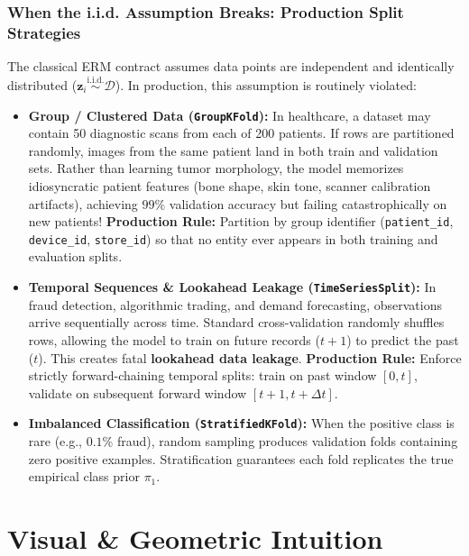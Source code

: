 \subsubsection{When the i.i.d. Assumption Breaks: Production Split Strategies}
The classical ERM contract assumes data points are independent and identically distributed ($\mathbf{z}_i \overset{\text{i.i.d.}}{\sim} \mathcal{D}$). In production, this assumption is routinely violated:
\begin{itemize}
    \item \textbf{Group / Clustered Data (\texttt{GroupKFold}):} In healthcare, a dataset may contain 50 diagnostic scans from each of 200 patients. If rows are partitioned randomly, images from the same patient land in both train and validation sets. Rather than learning tumor morphology, the model memorizes idiosyncratic patient features (bone shape, skin tone, scanner calibration artifacts), achieving $99\%$ validation accuracy but failing catastrophically on new patients! \textbf{Production Rule:} Partition by group identifier (\texttt{patient\_id}, \texttt{device\_id}, \texttt{store\_id}) so that no entity ever appears in both training and evaluation splits.
    \item \textbf{Temporal Sequences \& Lookahead Leakage (\texttt{TimeSeriesSplit}):} In fraud detection, algorithmic trading, and demand forecasting, observations arrive sequentially across time. Standard cross-validation randomly shuffles rows, allowing the model to train on future records ($t+1$) to predict the past ($t$). This creates fatal \textbf{lookahead data leakage}. \textbf{Production Rule:} Enforce strictly forward-chaining temporal splits: train on past window $[0, t]$, validate on subsequent forward window $[t+1, t+\Delta t]$.
    \item \textbf{Imbalanced Classification (\texttt{StratifiedKFold}):} When the positive class is rare (e.g., $0.1\%$ fraud), random sampling produces validation folds containing zero positive examples. Stratification guarantees each fold replicates the true empirical class prior $\pi_1$.
\end{itemize}

\section{Visual \& Geometric Intuition}

